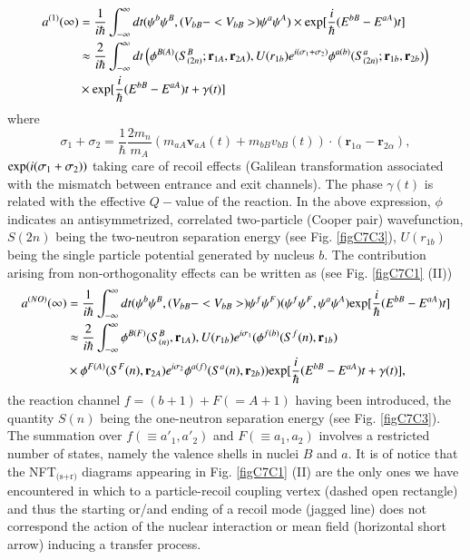 \begin{equation}\label{eq7.C.4}
\begin{split}
a^{(1)} (\infty)& = \frac{1}{i \hbar} \int^{\infty}_{-\infty} dt (\psi^b \psi^B, (V_{bB} - <V_{bB}>) \psi^a \psi^A ) \times 
{\rm exp} [\frac{i}{\hbar} (E^{bB} - E^{aA}) t]  \\
&\approx \frac{2}{i \hbar} \int^{\infty}_{- \infty}  dt \left( \phi^{B(A)} (S^B_{(2n)}; \mathbf r_{1A}, \mathbf r_{2A}), U(r_{1b}) 
e^{i (\sigma_1 + \sigma_2)}
\phi^{a(b)} (S^a_{(2n)}; \mathbf r_{1b}, \mathbf r_{2b}) \right)\\
&\times {\rm exp} [\frac{i}{\hbar} (E^{bB} - E^{aA}) t + \gamma(t)] 
\end{split}
\end{equation}
where 
\begin{equation}
\sigma_1 + \sigma_2 = \frac{1}{\hbar} \frac{2m_n}{m_A} ( m_{aA} \mathbf v_{aA} (t) + m_{bB} v_{bB}(t)) \cdot (\mathbf r_{1\alpha}
-\mathbf r_{2 \alpha}),
\end{equation}
${\rm exp} ( i (\sigma_1 + \sigma_2))$ taking care of recoil 
effects (Galilean transformation associated with the mismatch between entrance and exit channels). 
The phase $\gamma (t)$ is related  with the effective $Q-$value of the reaction. In the above expression, $\phi$ indicates an antisymmetrized, correlated two-particle (Cooper pair)  wavefunction, $S(2n)$ being the two-neutron separation energy (see Fig. \ref{figC7C3}), $U(r_{1b})$ being the single particle potential generated by nucleus $b$. The contribution arising from non-orthogonality effects can be written as (see Fig. \ref{figC7C1} (II))
\begin{equation}\label{eq7.C.6}
\begin{split}
a^{(NO)} (\infty) &= \frac{1}{i \hbar} \int^{\infty}_{-\infty} dt (\psi^b \psi^B, (V_{bB} - <V_{bB}>) \psi^f \psi^F )
(\psi^f\psi^F, \psi^a \psi^A) 
{\rm exp} [\frac{i}{\hbar} (E^{bB} - E^{aA}) t]    \\
&\approx \frac{2}{i \hbar} \int^{\infty}_{- \infty} \phi^{B(F)} (S^B_{(n)}, \mathbf r_{1A}), U(r_{1b}) 
e^{i \sigma_1}
(\phi^{f(b)}(S^f(n), \mathbf r_{1b})\\
&  \times\phi^{F(A)} (S^F(n),\mathbf r_{2A}) e^{i \sigma_2} \phi^{a(f)}(S^a(n),\mathbf r_{2b})) {\rm exp} [\frac{i}{\hbar} (E^{bB} - E^{aA}) t + \gamma(t)] ,
\end{split}
\end{equation}
the reaction channel $f= (b+1) + F(=A+1)$ having been introduced, the quantity $S(n)$ being the one-neutron separation 
energy (see Fig. \ref{figC7C3}). The summation over $f(\equiv a'_1,a'_2)$ and $F (\equiv a_1,a_2)$ involves a restricted number of states, namely the valence shells in nuclei $B$ and $a$. It is of notice that the NFT$_{\text{(s+r)}}$ diagrams appearing in Fig. \ref{figC7C1} (II) are the only ones we have encountered in which to a particle-recoil coupling vertex (dashed open rectangle) and thus the starting or/and ending of a recoil mode (jagged line) does not correspond the action of the nuclear interaction or mean field (horizontal short arrow) inducing a transfer process. 

